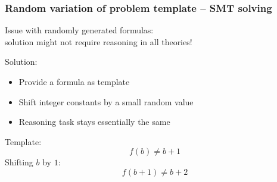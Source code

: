 \documentclass[xcolor={table}]{beamer}
\begin{document}
\begin{frame}
    \frametitle{Random variation of problem template -- SMT solving}

    Issue with randomly generated formulas: \\
    solution might not require reasoning in all theories!
    \bigskip
    \pause

    Solution:
    \begin{itemize}
        \item
            Provide a formula as template
        \item
            Shift integer constants by a small random value
        \item
            Reasoning task stays essentially the same
    \end{itemize}

    \begin{example}
        Template:
        \[ f(b) \neq b+1 \]
        Shifting $b$ by $1$:
        \[ f(b+1) \neq b+2 \]
    \end{example}
\end{frame}


\end{document}
